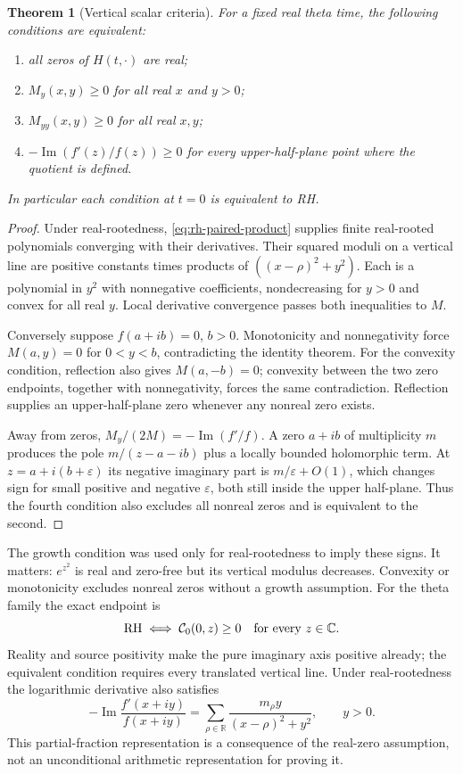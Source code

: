 \documentclass[11pt]{article}
\numberwithin{equation}{section}
\newtheorem{theorem}{Theorem}[section]
\theoremstyle{definition}
\theoremstyle{remark}
\begin{document}
\begin{theorem}[Vertical scalar criteria]\label{thm:rh-vertical}
For a fixed real theta time, the following conditions are equivalent:
\begin{enumerate}
 \item all zeros of $H(t,\cdot)$ are real;
 \item $M_y(x,y)\ge0$ for all real $x$ and $y>0$;
 \item $M_{yy}(x,y)\ge0$ for all real $x,y$;
 \item $-\operatorname{Im}(f'(z)/f(z))\ge0$ for every
 upper-half-plane point where the quotient is defined.
\end{enumerate}
In particular each condition at $t=0$ is equivalent to RH.
\end{theorem}
\begin{proof}
Under real-rootedness, \eqref{eq:rh-paired-product} supplies finite
real-rooted polynomials converging with their derivatives.  Their squared
moduli on a vertical line are positive constants times products of
$((x-\rho)^2+y^2)$.  Each is a polynomial in $y^2$ with nonnegative
coefficients, nondecreasing for $y>0$ and convex for all real $y$.
Local derivative convergence passes both inequalities to $M$.

Conversely suppose $f(a+ib)=0$, $b>0$.  Monotonicity and nonnegativity
force $M(a,y)=0$ for $0<y<b$, contradicting the identity theorem.
For the convexity condition, reflection also gives $M(a,-b)=0$;
convexity between the two zero endpoints, together with nonnegativity,
forces the same contradiction.  Reflection supplies an upper-half-plane
zero whenever any nonreal zero exists.

Away from zeros, $M_y/(2M)=-\operatorname{Im}(f'/f)$.
A zero $a+ib$ of multiplicity $m$ produces the pole
$m/(z-a-ib)$ plus a locally bounded holomorphic term.  At
$z=a+i(b+\varepsilon)$ its negative imaginary part is
$m/\varepsilon+O(1)$, which changes sign for small positive and
negative $\varepsilon$, both still inside the upper half-plane.
Thus the fourth condition also excludes all nonreal zeros and is
equivalent to the second.
\end{proof}
The growth condition was used only for real-rootedness to imply these
signs.  It matters: $e^{z^2}$ is real and zero-free but its vertical
modulus decreases.  Convexity or monotonicity excludes nonreal zeros
without a growth assumption.  For the theta family the exact endpoint is
\begin{equation}
 \mathrm{RH}\iff\mathcal C_0(0,z)\ge0
 \quad\hbox{for every }z\in\mathbb C.
 \label{eq:rh-whole-plane-criterion}
\end{equation}
Reality and source positivity make the pure imaginary axis positive
already; the equivalent condition requires every translated vertical
line.  Under real-rootedness the logarithmic derivative also satisfies
\[
 -\operatorname{Im}\frac{f'(x+iy)}{f(x+iy)}
 =\sum_{\rho\in\mathbb R}\frac{m_\rho y}{(x-\rho)^2+y^2},\qquad y>0.
\]
This partial-fraction representation is a consequence of the real-zero
assumption, not an unconditional arithmetic representation for proving it.
\end{document}
